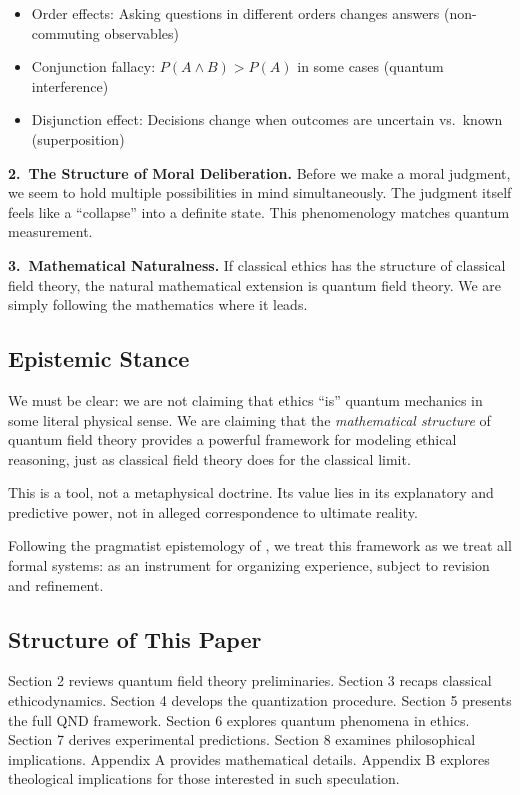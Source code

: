 \documentclass[12pt]{article}
\begin{document}
\begin{itemize}
    \item Order effects: Asking questions in different orders changes answers (non-commuting observables)
    \item Conjunction fallacy: $P(A \wedge B) > P(A)$ in some cases (quantum interference)
    \item Disjunction effect: Decisions change when outcomes are uncertain vs.\ known (superposition)
\end{itemize}

\textbf{2.\ The Structure of Moral Deliberation.} Before we make a moral judgment, we seem to hold multiple possibilities in mind simultaneously. The judgment itself feels like a ``collapse'' into a definite state. This phenomenology matches quantum measurement.

\textbf{3.\ Mathematical Naturalness.} If classical ethics has the structure of classical field theory, the natural mathematical extension is quantum field theory. We are simply following the mathematics where it leads.

\subsection{Epistemic Stance}

We must be clear: we are not claiming that ethics ``is'' quantum mechanics in some literal physical sense. We are claiming that the \emph{mathematical structure} of quantum field theory provides a powerful framework for modeling ethical reasoning, just as classical field theory does for the classical limit.

This is a tool, not a metaphysical doctrine. Its value lies in its explanatory and predictive power, not in alleged correspondence to ultimate reality.

Following the pragmatist epistemology of \cite{bond2025pragmatist}, we treat this framework as we treat all formal systems: as an instrument for organizing experience, subject to revision and refinement.

\subsection{Structure of This Paper}

Section 2 reviews quantum field theory preliminaries. Section 3 recaps classical ethicodynamics. Section 4 develops the quantization procedure. Section 5 presents the full QND framework. Section 6 explores quantum phenomena in ethics. Section 7 derives experimental predictions. Section 8 examines philosophical implications. Appendix A provides mathematical details. Appendix B explores theological implications for those interested in such speculation.
\end{document}
